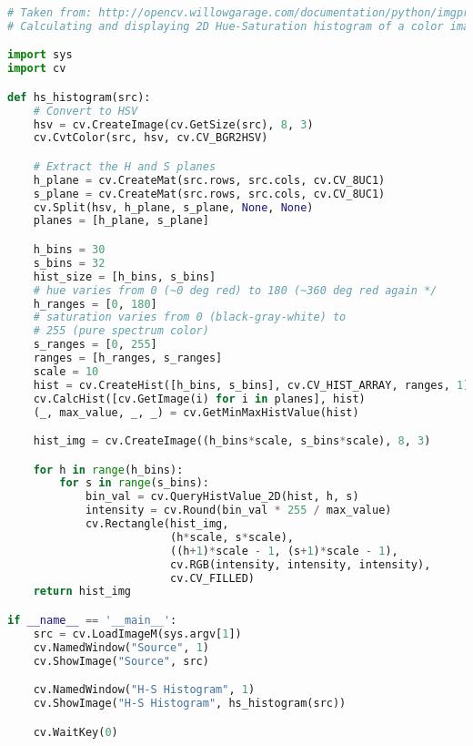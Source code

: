 \begin{lstlisting}[language=python,breaklines=true,
caption={Example Histogram calculation and displaying code from OpenCV\cite{opencv_library}.}] 
# Taken from: http://opencv.willowgarage.com/documentation/python/imgproc_histograms.html#calchist
# Calculating and displaying 2D Hue-Saturation histogram of a color image

import sys
import cv

def hs_histogram(src):
    # Convert to HSV
    hsv = cv.CreateImage(cv.GetSize(src), 8, 3)
    cv.CvtColor(src, hsv, cv.CV_BGR2HSV)

    # Extract the H and S planes
    h_plane = cv.CreateMat(src.rows, src.cols, cv.CV_8UC1)
    s_plane = cv.CreateMat(src.rows, src.cols, cv.CV_8UC1)
    cv.Split(hsv, h_plane, s_plane, None, None)
    planes = [h_plane, s_plane]

    h_bins = 30
    s_bins = 32
    hist_size = [h_bins, s_bins]
    # hue varies from 0 (~0 deg red) to 180 (~360 deg red again */
    h_ranges = [0, 180]
    # saturation varies from 0 (black-gray-white) to
    # 255 (pure spectrum color)
    s_ranges = [0, 255]
    ranges = [h_ranges, s_ranges]
    scale = 10
    hist = cv.CreateHist([h_bins, s_bins], cv.CV_HIST_ARRAY, ranges, 1)
    cv.CalcHist([cv.GetImage(i) for i in planes], hist)
    (_, max_value, _, _) = cv.GetMinMaxHistValue(hist)

    hist_img = cv.CreateImage((h_bins*scale, s_bins*scale), 8, 3)

    for h in range(h_bins):
        for s in range(s_bins):
            bin_val = cv.QueryHistValue_2D(hist, h, s)
            intensity = cv.Round(bin_val * 255 / max_value)
            cv.Rectangle(hist_img,
                         (h*scale, s*scale),
                         ((h+1)*scale - 1, (s+1)*scale - 1),
                         cv.RGB(intensity, intensity, intensity), 
                         cv.CV_FILLED)
    return hist_img

if __name__ == '__main__':
    src = cv.LoadImageM(sys.argv[1])
    cv.NamedWindow("Source", 1)
    cv.ShowImage("Source", src)

    cv.NamedWindow("H-S Histogram", 1)
    cv.ShowImage("H-S Histogram", hs_histogram(src))

    cv.WaitKey(0)
\end{lstlisting}
